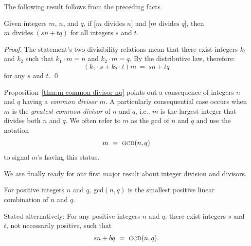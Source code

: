 The following result follows from the preceding facts.

\begin{prop}
\label{thm:m-common-divisor-nq}
Given integers $m$, $n$, and $q$, if [$m \mbox{ divides } n$] and [$m
  \mbox{ divides } q$], then
$m \mbox{ divides } (sn + tq)$ for all integers $s$ and $t$.
\end{prop}

\begin{proof}
The statement's two divisibility relations mean that there exist
integers $k_1$ and $k_2$ such that $k_1 \cdot m = n$ and $k_2 \cdot m
= q$.  By the distributive law, therefore:
\[ (k_1 \cdot s + k_2 \cdot t)m \ = \ sn+tq \]
for any $s$ and $t$.  \qed
\end{proof}

Proposition~\ref{thm:m-common-divisor-nq} points out a consequence of
integers $n$ and $q$ having a {\em common divisor} $m$.   A particularly consequential case occurs when $m$ is the
{\em greatest common divisor} of $n$ and $q$,  i.e., $m$ is the largest integer that divides both $n$ and
$q$.  We often refer to $m$ as the {\sc gcd}  of $n$ and $q$ and use the notation
\[ m \ = \ \mbox{\sc gcd}(n, q) \]
to signal $m$'s having this status.

We are finally ready for our first major result about integer division
and divisors.


\begin{prop}
\label{thm:gcd-n-linear}
For positive integers $n$ and $q$, {\sc gcd}$(n, q)$ is the smallest
positive linear combination of $n$ and $q$.

\noindent
Stated alternatively: For any positive integers $n$ and $q$, there
exist integers $s$ and $t$, not necessarily positive, such that
\[ sn + bq \ = \ \mbox{\sc gcd}(n, q). \]
\end{prop}

